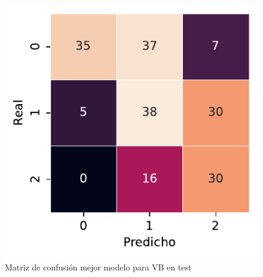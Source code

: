 \begin{figure}[htbp]
    \includegraphics[width=0.75\linewidth]{figures/5_experiments/single-vb-cm.pdf}
    \caption{Matriz de confusión mejor modelo para VB en test}
    \label{fig5:VB_confusion_matrix}
\end{figure}

